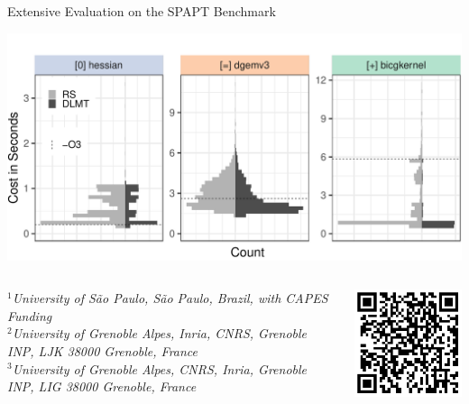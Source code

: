\documentclass[11pt, compress, aspectratio=169, xcolor={table,usenames,dvipsnames}]{beamer}
\begin{document}
\begin{frame}
\begin{columns}
\begin{column}{0.89\columnwidth}
\begin{columns}
\begin{column}[t]{0.48\columnwidth}
\begin{block}{ \vphantom{g}Extensive Evaluation on the SPAPT Benchmark}
\begin{itemize}
\begin{center}
\begin{center}
\includegraphics[width=0.85\columnwidth]{../../../img/split_histograms.pdf}
\end{center}
\end{center}
\end{itemize}
\end{block}
\end{column}
\end{columns}
\begin{columns}
\begin{column}{0.93\columnwidth}
\begin{flushleft}
\vspace{1.3em}
  {\small
    \textit{$^{1}$University of São Paulo, São Paulo, Brazil, with CAPES Funding \\
      $^{2}$University of Grenoble Alpes, Inria, CNRS, Grenoble INP, LJK 38000 Grenoble, France \\[-0.2em]
      $^{3}$University of Grenoble Alpes, CNRS, Inria, Grenoble INP, LIG 38000 Grenoble, France
    }
  }
\end{flushleft}
\end{column}
\begin{column}{0.07\columnwidth}
\vspace{1em}
\begin{center}
\includegraphics[width=.8\columnwidth]{../../../img/sbacpad19_poster_qrcode.pdf}

\end{center}
\end{column}
\end{columns}
\end{column}
\end{columns}
\end{frame}
\end{document}
